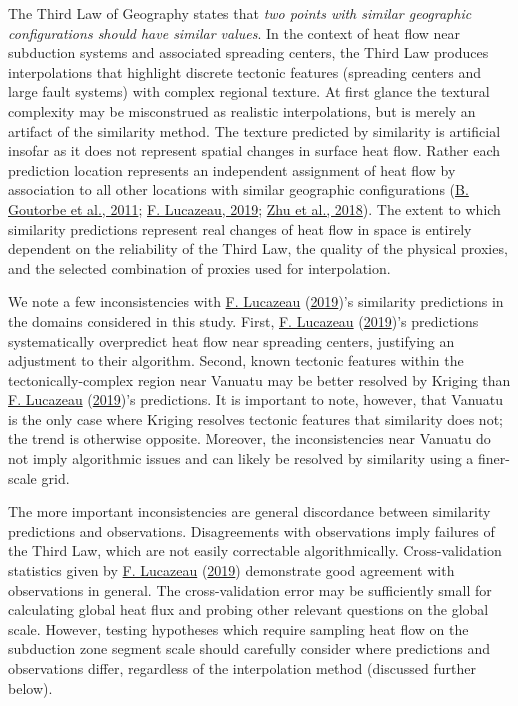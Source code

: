 \documentclass[draft,linenumbers]{agujournal2018}
\begin{document}
The Third Law of Geography states that \emph{two points with similar
geographic configurations should have similar values}. In the context of
heat flow near subduction systems and associated spreading centers, the
Third Law produces interpolations that highlight discrete tectonic
features (spreading centers and large fault systems) with complex
regional texture. At first glance the textural complexity may be
misconstrued as realistic interpolations, but is merely an artifact of
the similarity method. The texture predicted by similarity is artificial
insofar as it does not represent spatial changes in surface heat flow.
Rather each prediction location represents an independent assignment of
heat flow by association to all other locations with similar geographic
configurations (\protect\hyperlink{ref-goutorbe2011}{B. Goutorbe et al.,
2011}; \protect\hyperlink{ref-lucazeau2019}{F. Lucazeau, 2019};
\protect\hyperlink{ref-zhu2018}{Zhu et al., 2018}). The extent to which
similarity predictions represent real changes of heat flow in space is
entirely dependent on the reliability of the Third Law, the quality of
the physical proxies, and the selected combination of proxies used for
interpolation.

We note a few inconsistencies with
\protect\hyperlink{ref-lucazeau2019}{F. Lucazeau}
(\protect\hyperlink{ref-lucazeau2019}{2019})'s similarity predictions in
the domains considered in this study. First,
\protect\hyperlink{ref-lucazeau2019}{F. Lucazeau}
(\protect\hyperlink{ref-lucazeau2019}{2019})'s predictions
systematically overpredict heat flow near spreading centers, justifying
an adjustment to their algorithm. Second, known tectonic features within
the tectonically-complex region near Vanuatu may be better resolved by
Kriging than \protect\hyperlink{ref-lucazeau2019}{F. Lucazeau}
(\protect\hyperlink{ref-lucazeau2019}{2019})'s predictions. It is
important to note, however, that Vanuatu is the only case where Kriging
resolves tectonic features that similarity does not; the trend is
otherwise opposite. Moreover, the inconsistencies near Vanuatu do not
imply algorithmic issues and can likely be resolved by similarity using
a finer-scale grid.

The more important inconsistencies are general discordance between
similarity predictions and observations. Disagreements with observations
imply failures of the Third Law, which are not easily correctable
algorithmically. Cross-validation statistics given by
\protect\hyperlink{ref-lucazeau2019}{F. Lucazeau}
(\protect\hyperlink{ref-lucazeau2019}{2019}) demonstrate good agreement
with observations in general. The cross-validation error may be
sufficiently small for calculating global heat flux and probing other
relevant questions on the global scale. However, testing hypotheses
which require sampling heat flow on the subduction zone segment scale
should carefully consider where predictions and observations differ,
regardless of the interpolation method (discussed further below).
\end{document}

